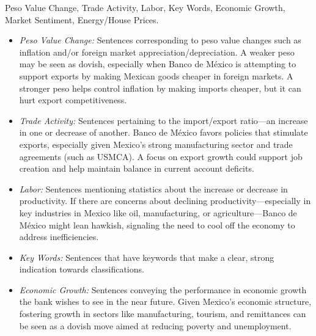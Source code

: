  Peso Value Change, Trade Activity, Labor, Key Words, Economic Growth,  Market Sentiment, Energy/House Prices.

\begin{itemize}
    \item \textit{Peso Value Change:}  
    Sentences corresponding to peso value changes such as inflation and/or foreign market appreciation/depreciation. A weaker peso may be seen as dovish, especially when Banco de México is attempting to support exports by making Mexican goods cheaper in foreign markets. A stronger peso helps control inflation by making imports cheaper, but it can hurt export competitiveness.

    \item \textit{Trade Activity:}  
    Sentences pertaining to the import/export ratio—an increase in one or decrease of another. Banco de México favors policies that stimulate exports, especially given Mexico’s strong manufacturing sector and trade agreements (such as USMCA). A focus on export growth could support job creation and help maintain balance in current account deficits.

    \item \textit{Labor:}  
    Sentences mentioning statistics about the increase or decrease in productivity. If there are concerns about declining productivity—especially in key industries in Mexico like oil, manufacturing, or agriculture—Banco de México might lean hawkish, signaling the need to cool off the economy to address inefficiencies.

    \item \textit{Key Words:}  
    Sentences that have keywords that make a clear, strong indication towards classifications.


    \item \textit{Economic Growth:}  
    Sentences conveying the performance in economic growth the bank wishes to see in the near future. Given Mexico’s economic structure, fostering growth in sectors like manufacturing, tourism, and remittances can be seen as a dovish move aimed at reducing poverty and unemployment.


\end{itemize}
